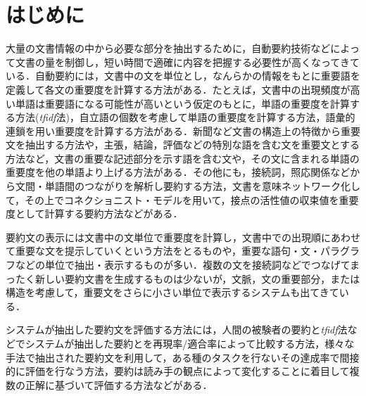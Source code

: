 


\maketitle
\thispagestyle{empty}


\section{はじめに}

大量の文書情報の中から必要な部分を抽出するために，自動要約技術などによって文書の量を制御し，短い時間で適確に内容を把握する必要性が高くなってきている．自動要約には，文書中の文を単位とし，なんらかの情報をもとに重要語を定義して各文の重要度を計算する方法がある．たとえば，文書中の出現頻度が高い単語は重要語になる可能性が高いという仮定のもとに，単語の重要度を計算する方法({\it tfidf}法)\cite{salton1989}，自立語の個数を考慮して単語の重要度を計算する方法\cite{robertson1997}，語彙的連鎖を用い重要度を計算する方法\cite{mochizuki2000}がある．新聞など文書の構造上の特徴から重要文を抽出する方法や，主張，結論，評価などの特別な語を含む文を重要文とする方法など，文書の重要な記述部分を示す語を含む文や，その文に含まれる単語の重要度を他の単語より上げる方法がある\cite{watanabe1996}．その他にも，接続詞，照応関係などから文間・単語間のつながりを解析し要約する方法，文書を意味ネットワーク化して，その上でコネクショニスト・モデルを用いて，接点の活性値の収束値を重要度として計算する要約方法\cite{Hasida1987,Nagao1998}などがある．

要約文の表示には文書中の文単位で重要度を計算し，文書中での出現順にあわせて重要な文を提示していくという方法をとるものや，重要な語句・文・パラグラフなどの単位で抽出・表示するものが多い．複数の文を接続詞などでつなげてまったく新しい要約文書を生成するものは少ないが，文脈，文の重要部分，または構造を考慮して，重要文をさらに小さい単位で表示するシステムも出てきている\cite{nomura1999}．

システムが抽出した要約文を評価する方法には，人間の被験者の要約と{\it tfidf}法などでシステムが抽出した要約とを再現率/適合率によって比較する方法\cite{Zechner1996}，様々な手法で抽出された要約文を利用して，ある種のタスクを行ないその達成率で間接的に評価を行なう方法\cite{mochizukiLREC2000}，要約は読み手の観点によって変化することに着目して複数の正解に基づいて評価する方法\cite{ishikawa2002}などがある．

